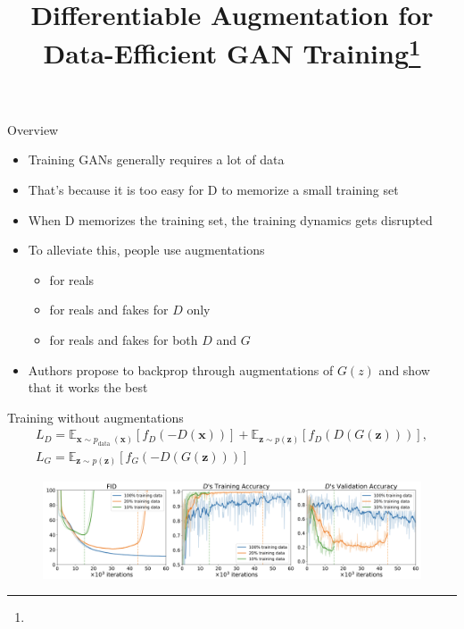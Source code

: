 \documentclass[handout, 10pt]{beamer}
\title{Differentiable Augmentation for Data-Efficient GAN Training\footnote{\citepaper{diff_augment}}}
\begin{document}
\begin{frame}
    \titlepage
\end{frame}

\begin{frame}{Overview}
\begin{itemize}
    \item\pause Training GANs generally requires a lot of data
    \item\pause That's because it is too easy for D to memorize a small training set
    \item\pause When D memorizes the training set, the training dynamics gets disrupted
    \item\pause To alleviate this, people use augmentations
    \begin{itemize}
        \item\pause for reals
        \item\pause for reals and fakes for $D$ only
        \item\pause for reals and fakes for both $D$ and $G$
    \end{itemize}
    \item\pause Authors propose to backprop through augmentations of $G(z)$ and show that it works the best
\end{itemize}
\end{frame}

\begin{frame}{Training without augmentations}
\begin{equation}
\begin{array}{l}
L_{D}=\mathbb{E}_{\boldsymbol{x} \sim p_{\text {data }}(\boldsymbol{x})}\left[f_{D}(-D(\boldsymbol{x}))\right]+\mathbb{E}_{\boldsymbol{z} \sim p(\boldsymbol{z})}\left[f_{D}(D(G(\boldsymbol{z})))\right], \\
L_{G}=\mathbb{E}_{\boldsymbol{z} \sim p(\boldsymbol{z})}\left[f_{G}(-D(G(\boldsymbol{z})))\right]
\end{array}
\end{equation}

\begin{figure}
\centering
\includegraphics[width=\textwidth]{images/training-without-augs}
\end{figure}
\end{frame}
\end{document}
